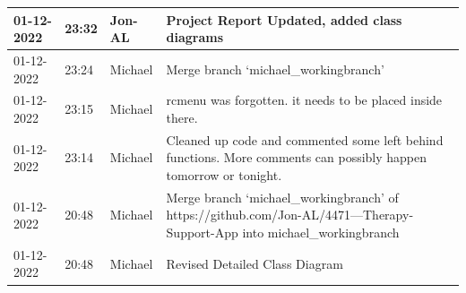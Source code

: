 \documentclass[11pt]{article}
\begin{document}
\begin{center}
\begin{longtable}{|p{2cm}|l|p{2cm}|p{10.5cm}|}
            01-12-2022                                 & 23:32                              & Jon-AL                                  & Project Report Updated, added class diagrams                                                                                                                                                                                                                                                                 \\ \hline
            01-12-2022                                 & 23:24                              & Michael                                 & Merge branch `michael\_workingbranch'                                                                                                                                                                                                                                                                        \\ \hline
            01-12-2022                                 & 23:15                              & Michael                                 & rcmenu was forgotten. it needs to be placed inside there.                                                                                                                                                                                                                                                    \\ \hline
            01-12-2022                                 & 23:14                              & Michael                                 & Cleaned up code and commented some left behind functions. More comments can possibly happen tomorrow or tonight.                                                                                                                                                                                             \\ \hline
            01-12-2022                                 & 20:48                              & Michael                                 & Merge branch `michael\_workingbranch' of https://github.com/Jon-AL/4471---Therapy-Support-App into michael\_workingbranch                                                                                                                                                                                    \\ \hline
            01-12-2022                                 & 20:48                              & Michael                                 & Revised Detailed Class Diagram                                                                                                                                                                                                                                                                               \\ \hline

\end{longtable}
\end{center}
\end{document}
